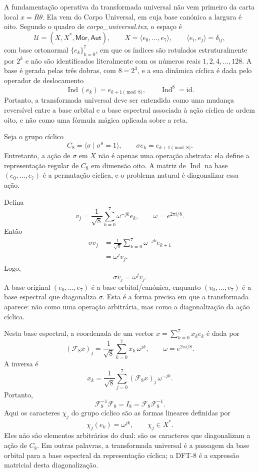 \documentclass[11pt,a4paper]{article}
\begin{document}
A fundamentação operativa da transformada universal não vem primeiro da carta local $x=R\theta$. Ela vem do Corpo Universal, em cuja base canónica a largura é oito. Segundo o quadro de \emph{corpo\_universal.tex}, o espaço é
\[
\mathcal U=(X,X^*,\mathsf{Mor},\mathsf{Aut}),
\qquad
X=\bigl\langle e_0,\ldots,e_7\bigr\rangle,
\qquad
\langle e_i,e_j\rangle=\delta_{ij},
\]
com base ortonormal \(\{e_k\}_{k=0}^{7}\), em que os índices são rotulados estruturalmente por $2^k$ e não são identificados literalmente com os números reais $1,2,4,\ldots,128$. A base é gerada pelas três dobras, com $8=2^3$, e a sua dinâmica cíclica é dada pelo operador de deslocamento
\[
\operatorname{Ind}(e_k)=e_{k+1\pmod 8},
\qquad
\operatorname{Ind}^{8}=\mathrm{id}.
\]
Portanto, a transformada universal deve ser entendida como uma mudança reversível entre a base orbital e a base espectral associada à ação cíclica de ordem oito, e não como uma fórmula mágica aplicada sobre a reta.

Seja o grupo cíclico
\[
C_8=\langle\sigma\mid \sigma^8=1\rangle,
\qquad
\sigma e_k=e_{k+1\pmod 8}.
\]
Entretanto, a ação de \(\sigma\) em \(X\) não é apenas uma operação abstrata: ela define a representação regular de \(C_8\) em dimensão oito. A matriz de \(\operatorname{Ind}\) na base \((e_0,\ldots,e_7)\) é a permutação cíclica, e o problema natural é diagonalizar essa ação.

Defina
\[
 v_j
=
\frac1{\sqrt8}\sum_{k=0}^{7}\omega^{-jk}e_k,
\qquad
\omega=e^{2\pi i/8}.
\]
Então
\[
\begin{aligned}
\sigma v_j
&=
\frac1{\sqrt8}\sum_{k=0}^{7}\omega^{-jk}e_{k+1}
\nonumber\\[2mm]
&=
\omega^j v_j.
\end{aligned}
\]
Logo,
\[
\boxed{\sigma v_j=\omega^j v_j.}
\]
A base original \((e_0,\ldots,e_7)\) é a base orbital/canónica, enquanto \((v_0,\ldots,v_7)\) é a base espectral que diagonaliza \(\sigma\). Esta é a forma precisa em que a transformada aparece: não como uma operação arbitrária, mas como a diagonalização da ação cíclica.

Nesta base espectral, a coordenada de um vector \(x=\sum_{k=0}^{7}x_k e_k\) é dada por
\[
\boxed{
(\mathcal F_8 x)_j
=
\frac1{\sqrt8}\sum_{k=0}^{7}x_k\,\omega^{jk},
\qquad
\omega=e^{2\pi i/8}.
}
\]
A inversa é
\[
\boxed{
x_k
=
\frac1{\sqrt8}\sum_{j=0}^{7}(\mathcal F_8 x)_j\,\omega^{-jk}.
}
\]
Portanto,
\[
\mathcal F_8^{-1}\mathcal F_8=I_8=\mathcal F_8\mathcal F_8^{-1}.
\]
Aqui os caracteres $\chi_j$ do grupo cíclico são as formas lineares definidas por
\[
\chi_j(e_k)=\omega^{jk},
\qquad
\chi_j\in X^*.
\]
Eles não são elementos arbitrários do dual: são os caracteres que diagonalizam a ação de $C_8$. Em outras palavras, a transformada universal é a passagem da base orbital para a base espectral da representação cíclica; a DFT-8 é a expressão matricial desta diagonalização.
\end{document}
